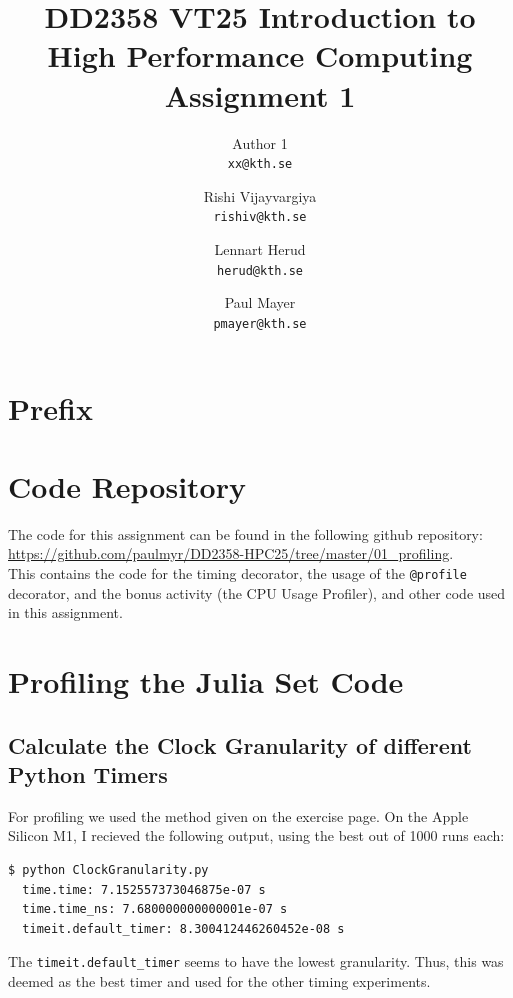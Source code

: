 \documentclass[a4paper,12pt]{article}
\title{
  \normalsize{DD2358 VT25 Introduction to}\\
  \normalsize{High Performance Computing}\\
  \large{Assignment 1}\\
}
\author{
  \small Author 1\\[-0.75ex]
  \scriptsize\texttt{xx@kth.se}
  \and
  \small Rishi Vijayvargiya\\[-0.75ex]
  \scriptsize\texttt{rishiv@kth.se}
  \and
  \small Lennart Herud\\[-0.75ex]
  \scriptsize\texttt{herud@kth.se}
  \and
  \small Paul Mayer\\[-0.75ex]
  \scriptsize\texttt{pmayer@kth.se}
}
\date{}
\begin{document}
\maketitle
\thispagestyle{firstpagestyle}

\listoftodos

\vspace{1em}

%
\section*{Prefix}

%

\section{Code Repository}
The code for this assignment can be found in the following github repository: \url{https://github.com/paulmyr/DD2358-HPC25/tree/master/01_profiling}. \\

This contains the code for the timing decorator, the usage of the \verb|@profile| decorator, and the bonus activity (the CPU Usage Profiler), and other code used in this assignment.

\section{Profiling the Julia Set Code}
\subsection{Calculate the Clock Granularity of different Python Timers}
For profiling we used the method given on the exercise page.
On the Apple Silicon M1, I recieved the following output, using the best out of 1000 runs each:
\begin{lstlisting}[language=bash,basicstyle=\ttfamily]
  $ python ClockGranularity.py
  time.time: 7.152557373046875e-07 s
  time.time_ns: 7.680000000000001e-07 s
  timeit.default_timer: 8.300412446260452e-08 s
\end{lstlisting}
The \verb|timeit.default_timer| seems to have the lowest granularity. Thus, this was deemed as the best timer and used for the other timing experiments. 
\end{document}
